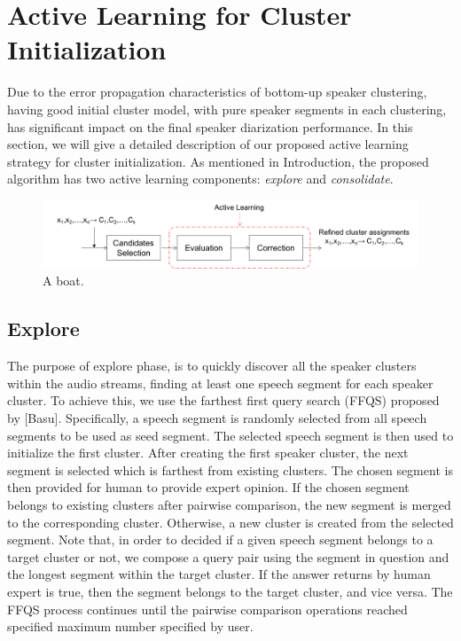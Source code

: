 \documentclass[journal]{IEEEtran}
\begin{document}
\section{Active Learning for Cluster Initialization}
Due to the error propagation characteristics of bottom-up speaker clustering, having good initial cluster model, with pure speaker segments in each clustering, has significant impact on the final speaker diarization performance. In this section, we will give a detailed description of our proposed active learning strategy for cluster initialization. As mentioned in Introduction, the proposed algorithm has two active learning components: \textit{explore} and \textit{consolidate}.

\begin{figure}
	\includegraphics[width=\linewidth]{figs/flow4}
	\caption{A boat.}
	\label{fig:boat1}
\end{figure}

\subsection{Explore}
The purpose of explore phase, is to quickly discover all the speaker clusters within the audio streams, finding at least one speech segment for each speaker cluster. To achieve this, we use the farthest first query search (FFQS) proposed by [Basu]. Specifically, a speech segment is randomly selected from all speech segments to be used as seed segment. The selected speech segment is then used to initialize the first cluster. After creating the first speaker cluster, the next segment is selected which is farthest from existing clusters. The chosen segment is then provided for human to provide expert opinion. If the chosen segment belongs to existing clusters after pairwise comparison, the new segment is merged to the corresponding cluster. Otherwise, a new cluster is created from the selected segment. Note that, in order to decided if a given speech segment belongs to a target cluster or not, we compose a query pair using the segment in question and the longest segment within the target cluster. If the answer returns by human expert is true, then the segment belongs to the target cluster, and vice versa. The FFQS process continues until the pairwise comparison operations reached specified maximum number specified by user.   
 
\end{document}

